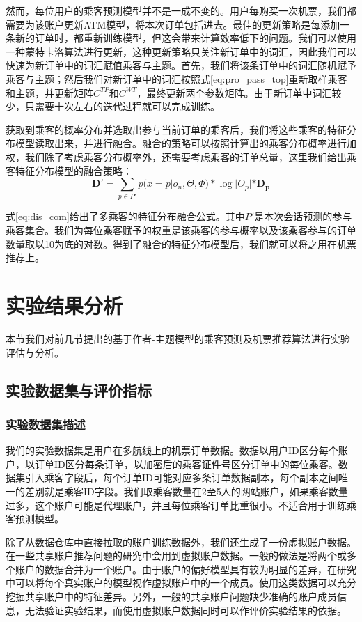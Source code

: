 然而，每位用户的乘客预测模型并不是一成不变的。用户每购买一次机票，我们都需要为该账户更新ATM模型，将本次订单包括进去。最佳的更新策略是每添加一条新的订单时，都重新训练模型，但这会带来计算效率低下的问题。我们可以使用一种蒙特卡洛算法进行更新，这种更新策略只关注新订单中的词汇，因此我们可以快速为新订单中的词汇赋值乘客与主题。首先，我们将该条订单中的词汇随机赋予乘客与主题；然后我们对新订单中的词汇按照式\ref{eq:pro_pass_top}重新取样乘客和主题，并更新矩阵$C^{TP}$和$C^{WT}$，最终更新两个参数矩阵。由于新订单中词汇较少，只需要十次左右的迭代过程就可以完成训练。

获取到乘客的概率分布并选取出参与当前订单的乘客后，我们将这些乘客的特征分布模型读取出来，并进行融合。融合的策略可以按照计算出的乘客分布概率进行加权，我们除了考虑乘客分布概率外，还需要考虑乘客的订单总量，这里我们给出乘客特征分布模型的融合策略：
\begin{equation}
	\label{eq:dis_com}
	\mathbf{D'} = \sum_{p \in P'} p(x = p|o_n,\Theta,\Phi) * \log |O_p| * \mathbf{D_p}
\end{equation}

式\ref{eq:dis_com}给出了多乘客的特征分布融合公式。其中$P'$是本次会话预测的参与乘客集合。我们为每位乘客赋予的权重是该乘客的参与概率以及该乘客参与的订单数量取以10为底的对数。得到了融合的特征分布模型后，我们就可以将之用在机票推荐上。

\section{实验结果分析}

本节我们对前几节提出的基于作者-主题模型的乘客预测及机票推荐算法进行实验评估与分析。

\subsection{实验数据集与评价指标}

\subsubsection{实验数据集描述}
我们的实验数据集是用户在多航线上的机票订单数据。数据以用户ID区分每个账户，以订单ID区分每条订单，以加密后的乘客证件号区分订单中的每位乘客。数据集引入乘客字段后，每个订单ID可能对应多条订单数据副本，每个副本之间唯一的差别就是乘客ID字段。我们取乘客数量在2至5人的网站账户，如果乘客数量过多，这个账户可能是代理账户，并且每位乘客订单比重很小。不适合用于训练乘客预测模型。

除了从数据仓库中直接拉取的账户训练数据外，我们还生成了一份虚拟账户数据。在一些共享账户推荐问题的研究中会用到虚拟账户数据。一般的做法是将两个或多个账户的数据合并为一个账户。由于账户的偏好模型具有较为明显的差异，在研究中可以将每个真实账户的模型视作虚拟账户中的一个成员。使用这类数据可以充分挖掘共享账户中的特征差异。另外，一般的共享账户问题缺少准确的账户成员信息，无法验证实验结果，而使用虚拟账户数据同时可以作评价实验结果的依据。

